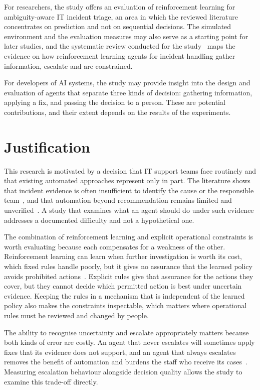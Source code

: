 For researchers, the study offers an evaluation of reinforcement learning for ambiguity-aware IT incident triage, an area in which the reviewed literature concentrates on prediction and not on sequential decisions. The simulated environment and the evaluation measures may also serve as a starting point for later studies, and the systematic review conducted for the study~\cite{opol2026slr} maps the evidence on how reinforcement learning agents for incident handling gather information, escalate and are constrained.

For developers of AI systems, the study may provide insight into the design and evaluation of agents that separate three kinds of decision: gathering information, applying a fix, and passing the decision to a person. These are potential contributions, and their extent depends on the results of the experiments.

\section{Justification}

This research is motivated by a decision that IT support teams face routinely and that existing automated approaches represent only in part. The literature shows that incident evidence is often insufficient to identify the cause or the responsible team~\cite{chen2020}, and that automation beyond recommendation remains limited and unverified~\cite{zhang2025}. A study that examines what an agent should do under such evidence addresses a documented difficulty and not a hypothetical one.

The combination of reinforcement learning and explicit operational constraints is worth evaluating because each compensates for a weakness of the other. Reinforcement learning can learn when further investigation is worth its cost, which fixed rules handle poorly, but it gives no assurance that the learned policy avoids prohibited actions~\cite{alshiekh2018}. Explicit rules give that assurance for the actions they cover, but they cannot decide which permitted action is best under uncertain evidence. Keeping the rules in a mechanism that is independent of the learned policy also makes the constraints inspectable, which matters where operational rules must be reviewed and changed by people.

The ability to recognise uncertainty and escalate appropriately matters because both kinds of error are costly. An agent that never escalates will sometimes apply fixes that its evidence does not support, and an agent that always escalates removes the benefit of automation and burdens the staff who receive its cases~\cite{turan2026}. Measuring escalation behaviour alongside decision quality allows the study to examine this trade-off directly.


